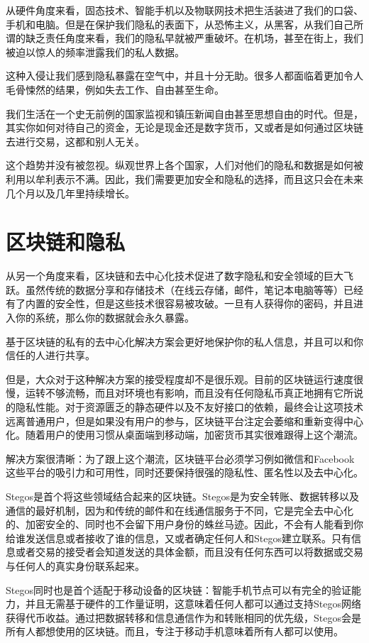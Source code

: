 \documentclass[8pt,fleqn,openany]{book}
\begin{document}
\begin{CJK*}{UTF8}{gbsn}
从硬件角度来看，固态技术、智能手机以及物联网技术把生活装进了我们的口袋、手机和电脑。但是在保护我们隐私的表面下，从恐怖主义，从黑客，从我们自己所谓的缺乏责任角度来看，我们的隐私早就被严重破坏。在机场，甚至在街上，我们被迫以惊人的频率泄露我们的私人数据。

这种入侵让我们感到隐私暴露在空气中，并且十分无助。很多人都面临着更加令人毛骨悚然的结果，例如失去工作、自由甚至生命。

我们生活在一个史无前例的国家监视和镇压新闻自由甚至思想自由的时代。但是，其实你如何对待自己的资金，无论是现金还是数字货币，又或者是如何通过区块链去进行交易，这都和别人无关。

这个趋势并没有被忽视。纵观世界上各个国家，人们对他们的隐私和数据是如何被利用以牟利表示不满。因此，我们需要更加安全和隐私的选择，而且这只会在未来几个月以及几年里持续增长。

\section{区块链和隐私}
从另一个角度来看，区块链和去中心化技术促进了数字隐私和安全领域的巨大飞跃。虽然传统的数据分享和存储技术（在线云存储，邮件，笔记本电脑等等）已经有了内置的安全性，但是这些技术很容易被攻破。一旦有人获得你的密码，并且进入你的系统，那么你的数据就会永久暴露。

基于区块链的私有的去中心化解决方案会更好地保护你的私人信息，并且可以和你信任的人进行共享。

但是，大众对于这种解决方案的接受程度却不是很乐观。目前的区块链运行速度很慢，运转不够流畅，而且对环境也有影响，而且没有任何隐私币真正地拥有它所说的隐私性能。对于资源匮乏的静态硬件以及不友好接口的依赖，最终会让这项技术远离普通用户，但是如果没有用户的参与，区块链平台注定会萎缩和重新变得中心化。随着用户的使用习惯从桌面端到移动端，加密货币其实很难跟得上这个潮流。

解决方案很清晰：为了跟上这个潮流，区块链平台必须学习例如微信和Facebook这些平台的吸引力和可用性，同时还要保持很强的隐私性、匿名性以及去中心化。

Stegos是首个将这些领域结合起来的区块链。Stegos是为安全转账、数据转移以及通信的最好机制，因为和传统的邮件和在线通信服务于不同，它是完全去中心化的、加密安全的、同时也不会留下用户身份的蛛丝马迹。因此，不会有人能看到你给谁发送信息或者接收了谁的信息，又或者确定任何人和Stegos建立联系。只有信息或者交易的接受者会知道发送的具体金额，而且没有任何东西可以将数据或交易与任何人的真实身份联系起来。

Stegos同时也是首个适配于移动设备的区块链：智能手机节点可以有完全的验证能力，并且无需基于硬件的工作量证明，这意味着任何人都可以通过支持Stegos网络获得代币收益。通过把数据转移和信息通信作为和转账相同的优先级，Stegos会是所有人都想使用的区块链。而且，专注于移动手机意味着所有人都可以使用。


\end{CJK*}
\end{document}

